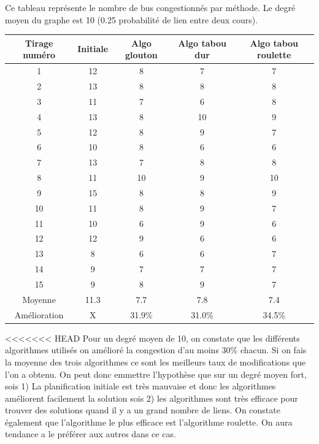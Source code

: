 \documentclass[a4paper,11pt]{article}
\begin{document}
	\newpage
	Ce tableau représente le nombre de bus congestionnés par méthode. Le degré moyen du graphe est 10 (0.25 probabilité de lien entre deux cours).\\ 
	\begin{tabular}{|c|c|c|c|c|}
  		\hline
  		Tirage numéro & Initiale & Algo glouton & Algo tabou dur & Algo tabou roulette\\
  		\hline
  		1 & 12 & 8 & 7 & 7\\
  		\hline
  		2 & 13& 8& 8&8\\
  		\hline
  		3 & 11 & 7 & 6 & 8\\
  		\hline
  		4 & 13 & 8 & 10 & 9\\
  		\hline
  		5 & 12 & 8 & 9 & 7\\
  		\hline
  		6 & 10 & 8 & 6 & 6\\
  		\hline
  		7 & 13 & 7 & 8 & 8\\
  		\hline
  		8 & 11 & 10 & 9 & 10\\
  		\hline
  		9 & 15 & 8 & 8 & 9\\
  		\hline
  		10 & 11 & 8 & 9 & 7\\
  		\hline
  		11 & 10 & 6 & 9 & 6\\
  		\hline
  		12 & 12 & 9 & 6 & 6\\
  		\hline
  		13 & 8 & 6 & 6 & 7\\
  		\hline
  		14 & 9 & 7 & 7 & 7\\
  		\hline
  		15 & 9 & 8 & 9 & 7\\
  		\hline
  		Moyenne  &11.3  &7.7  &7.8 &  7.4\\
  		\hline
  		Amélioration & X & 31.9\% & 31.0\% & 34.5\%\\
  		\hline
	\end{tabular}
<<<<<<< HEAD
	Pour un degré moyen de 10, on constate que les différents algorithmes utilisés on amélioré la congestion d'au moins 30\% chacun. Si on fais la moyenne des trois algorithmes ce sont les meilleurs taux de modifications que l'on a obtenu. On peut donc emmettre l'hypothèse que sur un degré moyen fort, sois 1) La planification initiale est très mauvaise et donc les algorithmes améliorent facilement la solution sois 2) les algorithmes sont très efficace pour trouver des solutions quand il y a un grand nombre de liens. On constate également que l'algorithme le plus efficace est l'algorithme roulette. On aura tendance a le préférer aux autres dans ce cas.
\end{document}
